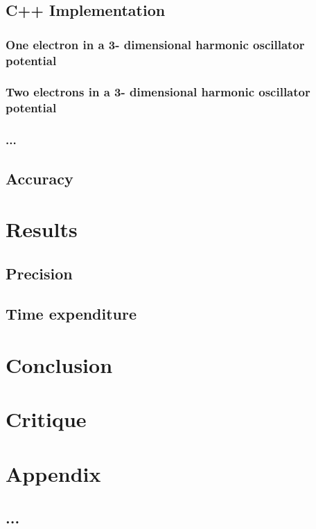 \documentclass[10pt,a4paper]{article}
\begin{document}
\subsection{C++ Implementation}
\subsubsection{One electron in a 3- dimensional harmonic oscillator potential}

\subsubsection{Two electrons in a 3- dimensional harmonic oscillator potential}

\subsubsection{...}

\subsection{Accuracy}

\section{Results}

\subsection{Precision}

\subsection{Time expenditure}

\section{Conclusion}

\section{Critique}

\section{Appendix}
\subsection{...}
\end{document}
